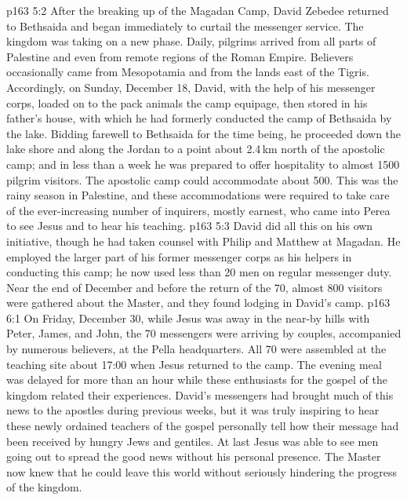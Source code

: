 \vs p163 5:2 After the breaking up of the Magadan Camp, David Zebedee returned to Bethsaida and began immediately to curtail the messenger service. The kingdom was taking on a new phase. Daily, pilgrims arrived from all parts of Palestine and even from remote regions of the Roman Empire. Believers occasionally came from Mesopotamia and from the lands east of the Tigris. Accordingly, on Sunday, December 18, David, with the help of his messenger corps, loaded on to the pack animals the camp equipage, then stored in his father’s house, with which he had formerly conducted the camp of Bethsaida by the lake. Bidding farewell to Bethsaida for the time being, he proceeded down the lake shore and along the Jordan to a point about 2.4\,km north of the apostolic camp; and in less than a week he was prepared to offer hospitality to almost 1500 pilgrim visitors. The apostolic camp could accommodate about 500. This was the rainy season in Palestine, and these accommodations were required to take care of the ever\hyp{}increasing number of inquirers, mostly earnest, who came into Perea to see Jesus and to hear his teaching.
\vs p163 5:3 David did all this on his own initiative, though he had taken counsel with Philip and Matthew at Magadan. He employed the larger part of his former messenger corps as his helpers in conducting this camp; he now used less than 20 men on regular messenger duty. Near the end of December and before the return of the 70, almost 800 visitors were gathered about the Master, and they found lodging in David’s camp.
\vs p163 6:1 On Friday, December 30, while Jesus was away in the near\hyp{}by hills with Peter, James, and John, the 70 messengers were arriving by couples, accompanied by numerous believers, at the Pella headquarters. All 70 were assembled at the teaching site about 17:00 when Jesus returned to the camp. The evening meal was delayed for more than an hour while these enthusiasts for the gospel of the kingdom related their experiences. David’s messengers had brought much of this news to the apostles during previous weeks, but it was truly inspiring to hear these newly ordained teachers of the gospel personally tell how their message had been received by hungry Jews and gentiles. At last Jesus was able to see men going out to spread the good news without his personal presence. The Master now knew that he could leave this world without seriously hindering the progress of the kingdom.

